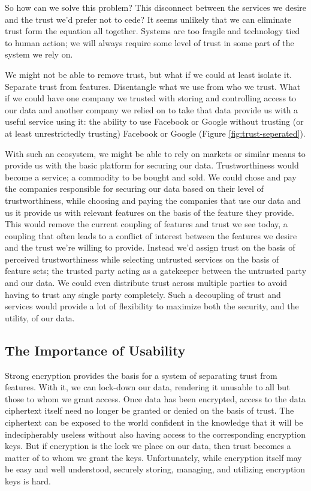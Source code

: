 So how can we solve this problem? This disconnect between the services
we desire and the trust we'd prefer not to cede? It seems unlikely
that we can eliminate trust form the equation all together. Systems
are too fragile and technology tied to human action; we will always
require some level of trust in some part of the system we rely on.

We might not be able to remove trust, but what if we could at least
isolate it. Separate trust from features. Disentangle what we use from
who we trust. What if we could have one company we trusted with
storing and controlling access to our data and another company we
relied on to take that data provide us with a useful service using it:
the ability to use Facebook or Google without trusting (or at least
unrestrictedly trusting) Facebook or Google (Figure
\ref{fig:trust-seperated}).

With such an ecosystem, we might be able to rely on markets or similar
means to provide us with the basic platform for securing our
data. Trustworthiness would become a service; a commodity to be bought
and sold. We could chose and pay the companies responsible for
securing our data based on their level of trustworthiness, while
choosing and paying the companies that use our data and us it provide
us with relevant features on the basis of the feature they
provide. This would remove the current coupling of features and trust
we see today, a coupling that often leads to a conflict of interest
between the features we desire and the trust we're willing to
provide. Instead we'd assign trust on the basis of perceived
trustworthiness while selecting untrusted services on the basis of
feature sets; the trusted party acting as a gatekeeper between the
untrusted party and our data. We could even distribute trust across
multiple parties to avoid having to trust any single party
completely. Such a decoupling of trust and services would provide a
lot of flexibility to maximize both the security, and the utility, of
our data.

\subsection{The Importance of Usability}

Strong encryption provides the basis for a system of separating trust
from features. With it, we can lock-down our data, rendering it
unusable to all but those to whom we grant access. Once data has been
encrypted, access to the data ciphertext itself need no longer be
granted or denied on the basis of trust. The ciphertext can be exposed
to the world confident in the knowledge that it will be indecipherably
useless without also having access to the corresponding encryption
keys. But if encryption is the lock we place on our data, then trust
becomes a matter of to whom we grant the keys. Unfortunately, while
encryption itself may be easy and well understood, securely storing,
managing, and utilizing encryption keys is hard.

